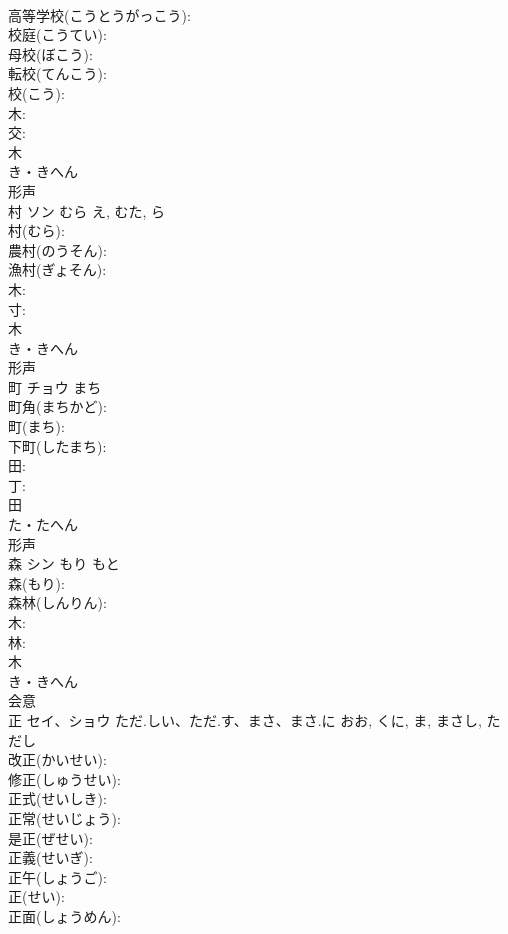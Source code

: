 \documentclass[8pt]{extreport}
\begin{document}
\begin{CJK}{UTF8}{min}
\\	高等学校(こうとうがっこう): 
\\	校庭(こうてい): 
\\	母校(ぼこう): 
\\	転校(てんこう): 
\\	校(こう): 
\\	木: 
\\	交: 
\\	木	
\\	き・きへん	
\\	形声 
\\	村	ソン	むら	え, むた, ら	
\\	村(むら): 
\\	農村(のうそん): 
\\	漁村(ぎょそん): 
\\	木: 
\\	寸: 
\\	木	
\\	き・きへん	
\\	形声 
\\	町	チョウ	まち		
\\	町角(まちかど): 
\\	町(まち): 
\\	下町(したまち): 
\\	田: 
\\	丁: 
\\	田	
\\	た・たへん	
\\	形声 
\\	森	シン	もり	もと	
\\	森(もり): 
\\	森林(しんりん): 
\\	木: 
\\	林: 
\\	木	
\\	き・きへん	
\\	会意 
\\	正	セイ、ショウ	ただ.しい、ただ.す、まさ、まさ.に	おお, くに, ま, まさし, ただし	
\\	改正(かいせい): 
\\	修正(しゅうせい): 
\\	正式(せいしき): 
\\	正常(せいじょう): 
\\	是正(ぜせい): 
\\	正義(せいぎ): 
\\	正午(しょうご): 
\\	正(せい): 
\\	正面(しょうめん): 

\end{CJK}
\end{document}
